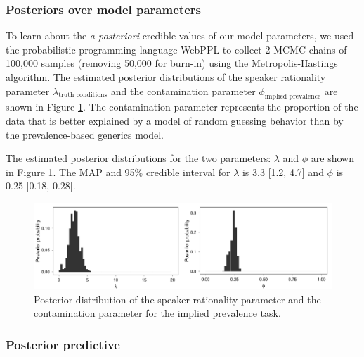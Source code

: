 \documentclass[10pt,letterpaper]{article}
\begin{document}
\subsubsection{Posteriors over model parameters}

To learn about the \emph{a posteriori} credible values of our model parameters, we used the probabilistic programming language WebPPL \cite{dippl} to collect 2 MCMC chains of 100,000 samples (removing 50,000 for burn-in) using the Metropolis-Hastings algorithm. 
The estimated posterior distributions of the speaker rationality parameter $\lambda_\text{truth conditions}$ and the contamination parameter $\phi_{\text{implied prevalence}}$ are shown in Figure \ref{fig:byItemParameters}. 
The contamination parameter represents the proportion of the data that is better explained by a model of random guessing behavior than by the prevalence-based generics model. 

The estimated posterior distributions for the two parameters: $\lambda$ and $\phi$ are shown in Figure \ref{fig:byItemParameters}.
The MAP and 95\% credible interval for $\lambda$ is 3.3 [1.2, 4.7] and $\phi$ is 0.25 [0.18, 0.28].


\begin{figure}
\centering
    \includegraphics[width=0.8\columnwidth]{asymmetry-byItem-params-2x50k.pdf}
    \caption{Posterior distribution of the speaker rationality parameter and the contamination parameter for the implied prevalence task.}
  \label{fig:byItemParameters}
\end{figure}

\subsubsection{Posterior predictive}
\end{document}
